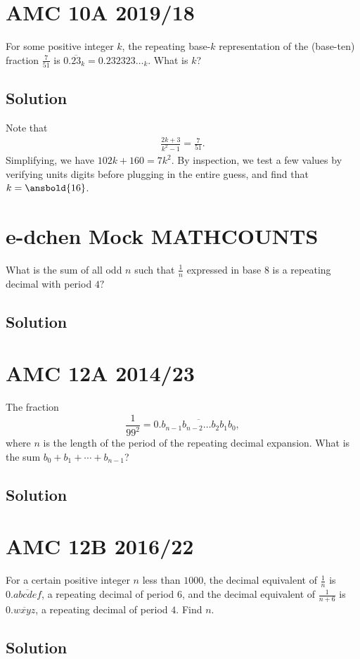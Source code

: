 \documentclass[mast]{lucky}
\begin{document}
\pagebreak\section{AMC 10A 2019/18}

For some positive integer $k$, the repeating base-$k$ representation of the (base-ten) fraction $\frac{7}{51}$ is $0.\overline{23}_k = 0.232323\ldots_k$. What is $k$?

\subsection{Solution}

Note that
\begin{align*}
\frac{2k + 3}{k^2 - 1} = \frac{7}{51}.
\end{align*}
Simplifying, we have $102k + 160 = 7k^2$. By inspection, we test a few values by verifying units digits before plugging in the entire guess, and find that $k = \ansbold{16}$.

\pagebreak\section{e-dchen Mock MATHCOUNTS}

What is the sum of all odd $n$ such that $\frac{1}{n}$ expressed in base $8$ is a repeating decimal with period $4?$

\subsection{Solution}

\pagebreak\section{AMC 12A 2014/23}

The fraction\[\dfrac1{99^2}=0.\overline{b_{n-1}b_{n-2}\ldots b_2b_1b_0},\]where $n$ is the length of the period of the repeating decimal expansion. What is the sum $b_0+b_1+\cdots+b_{n-1}$?

\subsection{Solution}

\pagebreak\section{AMC 12B 2016/22}

For a certain positive integer $n$ less than $1000$, the decimal equivalent of $\frac{1}{n}$ is $0.\overline{abcdef}$, a repeating decimal of period $6$, and the decimal equivalent of $\frac{1}{n+6}$ is $0.\overline{wxyz}$, a repeating decimal of period $4$. Find $n.$

\subsection{Solution}
\end{document}
